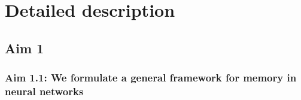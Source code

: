 \documentclass[12pt,letterpaper, onecolumn]{article}
\theoremstyle{definition}
\theoremstyle{remark}
\begin{document}



\newpage
\section{Detailed description}
\subsection*{Aim 1}

\subsubsection*{Aim 1.1: We formulate a general framework for memory in neural networks}


\end{document}
